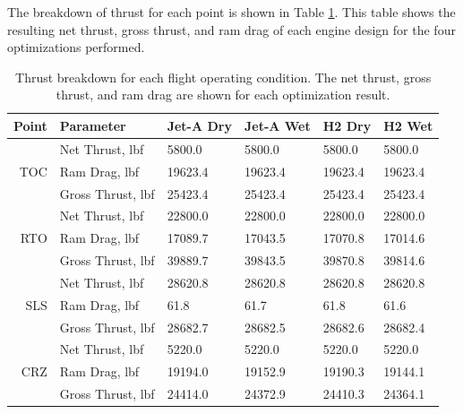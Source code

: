 \documentclass[conf]{new-aiaa}
\begin{document}
The breakdown of thrust for each point is shown in Table \ref{tab:thrust}.
This table shows the resulting net thrust, gross thrust, and ram drag of each engine design for the four optimizations performed.

\begin{table}[hbt!]
    \centering
    \caption{Thrust breakdown for each flight operating condition.
        The net thrust, gross thrust, and ram drag are shown for each optimization result.
    }
    \small
    \renewcommand{\arraystretch}{1.2}
    \begin{tabular}{r l l l l l}
        Point & Parameter              & Jet-A Dry & Jet-A Wet & H2 Dry  & H2 Wet  \\
        \toprule
              & Net Thrust, \si{lbf}   & 5800.0    & 5800.0    & 5800.0  & 5800.0  \\
        TOC   & Ram Drag, \si{lbf}     & 19623.4   & 19623.4   & 19623.4 & 19623.4 \\
              & Gross Thrust, \si{lbf} & 25423.4   & 25423.4   & 25423.4 & 25423.4 \\
        \hline
              & Net Thrust, \si{lbf}   & 22800.0   & 22800.0   & 22800.0 & 22800.0 \\
        RTO   & Ram Drag, \si{lbf}     & 17089.7   & 17043.5   & 17070.8 & 17014.6 \\
              & Gross Thrust, \si{lbf} & 39889.7   & 39843.5   & 39870.8 & 39814.6 \\
        \hline
              & Net Thrust, \si{lbf}   & 28620.8   & 28620.8   & 28620.8 & 28620.8 \\
        SLS   & Ram Drag, \si{lbf}     & 61.8      & 61.7      & 61.8    & 61.6    \\
              & Gross Thrust, \si{lbf} & 28682.7   & 28682.5   & 28682.6 & 28682.4 \\
        \hline
              & Net Thrust, \si{lbf}   & 5220.0    & 5220.0    & 5220.0  & 5220.0  \\
        CRZ   & Ram Drag, \si{lbf}     & 19194.0   & 19152.9   & 19190.3 & 19144.1 \\
              & Gross Thrust, \si{lbf} & 24414.0   & 24372.9   & 24410.3 & 24364.1 \\
        \bottomrule
    \end{tabular}
    \label{tab:thrust}
\end{table}
\end{document}
